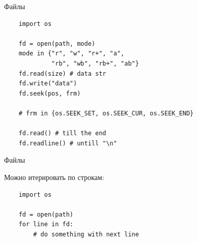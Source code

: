\documentclass{article}
\begin{document}
\begin{center} Файлы \end{center}

\begin{lstlisting}
	import os

    fd = open(path, mode)
    mode in {"r", "w", "r+", "a", 
             "rb", "wb", "rb+", "ab"}
	fd.read(size) # data str
	fd.write("data")
	fd.seek(pos, frm)
	
	# frm in {os.SEEK_SET, os.SEEK_CUR, os.SEEK_END}
	
	fd.read() # till the end
	fd.readline() # untill "\n"
\end{lstlisting}
\newpage

\begin{center} Файлы \end{center}
Можно итерировать по строкам:
\begin{lstlisting}
	import os

    fd = open(path)
    for line in fd:
    	# do something with next line
\end{lstlisting}
\newpage

\end{document}
